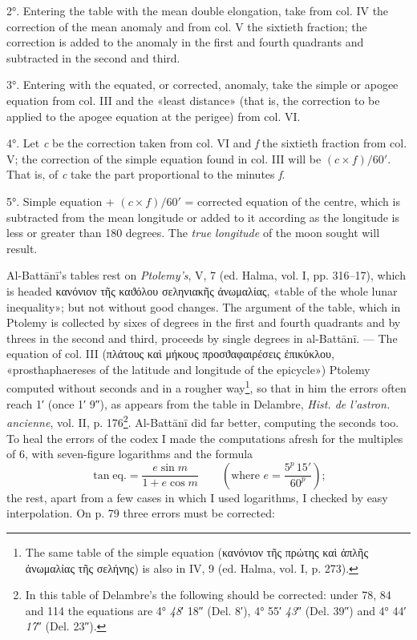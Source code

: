 \documentclass[11pt]{article}
\newcommand{\Pg}[1]{\marginpar{\footnotesize\color{gray}#1}}
\begin{document}
\par 2°. Entering the table with the mean double elongation, take from col. IV the correction of the mean anomaly and from col. V the sixtieth fraction; the correction is added to the anomaly in the first and fourth quadrants and subtracted in the second and third.\par
\par 3°. Entering with the equated, or corrected, anomaly, take the simple or apogee equation from col. III and the «least distance» (that is, the correction to be applied to the apogee equation at the perigee) from col. VI.\par
\par 4°. Let \emph{c} be the correction taken from col. VI and \emph{f} the sixtieth fraction from col. V; the correction of the simple equation found in col. III will be $(c \times f)/60'$. That is, of \emph{c} take the part proportional to the minutes \emph{f}.\par
\par 5°. Simple equation + $(c \times f)/60'$ = corrected equation of the centre, which is subtracted from the mean longitude or added to it according as the longitude is less or greater than 180 degrees. The \emph{true longitude} of the moon sought will result.\par
\par \Pg{II 226}Al-Battānī's tables rest on \emph{Ptolemy's}, V, 7 (ed. Halma, vol. I, pp. 316–17), which is headed {\greekfont κανόνιον τῆς καϑόλου σεληνιακῆς ἀνωμαλίας}, «table of the whole lunar inequality»; but not without good changes. The argument of the table, which in Ptolemy is collected by sixes of degrees in the first and fourth quadrants and by threes in the second and third, proceeds by single degrees in al-Battānī. — The equation of col. III ({\greekfont πλάτους καὶ μήκους προσϑαφαιρέσεις ἐπικύκλου}, «prosthaphaereses of the latitude and longitude of the epicycle») Ptolemy computed without seconds and in a rougher way\footnote{The same table of the simple equation ({\greekfont κανόνιον τῆς πρώτης καὶ ἁπλῆς ἀνωμαλίας τῆς σελήνης}) is also in IV, 9 (ed. Halma, vol. I, p. 273).}, so that in him the errors often reach 1′ (once 1′ 9″), as appears from the table in Delambre, \emph{Hist. de l'astron. ancienne}, vol. II, p. 176\footnote{In this table of Delambre's the following should be corrected: under 78, 84 and 114 the equations are 4° \emph{48}′ 18″ (Del. 8′), 4° 55′ \emph{43}″ (Del. 39″) and 4° 44′ \emph{17}″ (Del. 23″).}. Al-Battānī did far better, computing the seconds too. To heal the errors of the codex I made the computations afresh for the multiples of 6, with seven-figure logarithms and the formula \[ \tan \text{eq.} = \frac{e \sin m}{1 + e \cos m} \qquad \left(\text{where } e = \frac{5^{p}\,15'}{60^{p}}\right); \] the rest, apart from a few cases in which I used logarithms, I checked by easy interpolation. On p. 79 three errors must be corrected:\par
\end{document}
